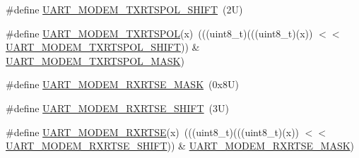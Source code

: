 \begin{DoxyCompactItemize}
\#define \mbox{\hyperlink{group___u_a_r_t___register___masks_ga3b069f2bfe05099b3fdb47e872c6b2e6}{U\+A\+R\+T\+\_\+\+M\+O\+D\+E\+M\+\_\+\+T\+X\+R\+T\+S\+P\+O\+L\+\_\+\+S\+H\+I\+FT}}~(2\+U)
\item 
\#define \mbox{\hyperlink{group___u_a_r_t___register___masks_ga741690168f975ff0c401791b7bde7254}{U\+A\+R\+T\+\_\+\+M\+O\+D\+E\+M\+\_\+\+T\+X\+R\+T\+S\+P\+OL}}(x)~(((uint8\+\_\+t)(((uint8\+\_\+t)(x)) $<$$<$ \mbox{\hyperlink{group___u_a_r_t___register___masks_ga3b069f2bfe05099b3fdb47e872c6b2e6}{U\+A\+R\+T\+\_\+\+M\+O\+D\+E\+M\+\_\+\+T\+X\+R\+T\+S\+P\+O\+L\+\_\+\+S\+H\+I\+FT}})) \& \mbox{\hyperlink{group___u_a_r_t___register___masks_ga83617aa9166494f2dbed5da69b5ae0ef}{U\+A\+R\+T\+\_\+\+M\+O\+D\+E\+M\+\_\+\+T\+X\+R\+T\+S\+P\+O\+L\+\_\+\+M\+A\+SK}})
\item 
\#define \mbox{\hyperlink{group___u_a_r_t___register___masks_gaceb719e6bb4624e1b8a5a922bd594778}{U\+A\+R\+T\+\_\+\+M\+O\+D\+E\+M\+\_\+\+R\+X\+R\+T\+S\+E\+\_\+\+M\+A\+SK}}~(0x8\+U)
\item 
\#define \mbox{\hyperlink{group___u_a_r_t___register___masks_gabbe55b53dd5c048084d8c9341e522d90}{U\+A\+R\+T\+\_\+\+M\+O\+D\+E\+M\+\_\+\+R\+X\+R\+T\+S\+E\+\_\+\+S\+H\+I\+FT}}~(3\+U)
\item 
\#define \mbox{\hyperlink{group___u_a_r_t___register___masks_ga959ac0c1d060aa20552e2e454d226779}{U\+A\+R\+T\+\_\+\+M\+O\+D\+E\+M\+\_\+\+R\+X\+R\+T\+SE}}(x)~(((uint8\+\_\+t)(((uint8\+\_\+t)(x)) $<$$<$ \mbox{\hyperlink{group___u_a_r_t___register___masks_gabbe55b53dd5c048084d8c9341e522d90}{U\+A\+R\+T\+\_\+\+M\+O\+D\+E\+M\+\_\+\+R\+X\+R\+T\+S\+E\+\_\+\+S\+H\+I\+FT}})) \& \mbox{\hyperlink{group___u_a_r_t___register___masks_gaceb719e6bb4624e1b8a5a922bd594778}{U\+A\+R\+T\+\_\+\+M\+O\+D\+E\+M\+\_\+\+R\+X\+R\+T\+S\+E\+\_\+\+M\+A\+SK}})
\end{DoxyCompactItemize}
